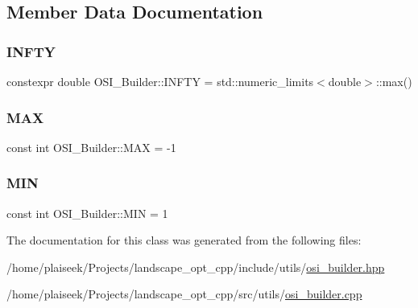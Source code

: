 \subsection{Member Data Documentation}
\mbox{\label{class_o_s_i___builder_ada1254828d2dd95d33cc28418270f88d}} 
\subsubsection{\texorpdfstring{I\+N\+F\+TY}{INFTY}}
{\footnotesize\ttfamily constexpr double O\+S\+I\+\_\+\+Builder\+::\+I\+N\+F\+TY = std\+::numeric\+\_\+limits$<$double$>$\+::max()\hspace{0.3cm}{\ttfamily [static]}}

\mbox{\label{class_o_s_i___builder_accf4032198acbf182e0d86af1c002c6e}} 
\subsubsection{\texorpdfstring{M\+AX}{MAX}}
{\footnotesize\ttfamily const int O\+S\+I\+\_\+\+Builder\+::\+M\+AX = -\/1\hspace{0.3cm}{\ttfamily [static]}}

\mbox{\label{class_o_s_i___builder_a3af4e2722a30807c440a3a243a3732f8}} 
\subsubsection{\texorpdfstring{M\+IN}{MIN}}
{\footnotesize\ttfamily const int O\+S\+I\+\_\+\+Builder\+::\+M\+IN = 1\hspace{0.3cm}{\ttfamily [static]}}



The documentation for this class was generated from the following files\+:\begin{DoxyCompactItemize}
\item 
/home/plaiseek/\+Projects/landscape\+\_\+opt\+\_\+cpp/include/utils/\hyperlink{osi__builder_8hpp}{osi\+\_\+builder.\+hpp}\item 
/home/plaiseek/\+Projects/landscape\+\_\+opt\+\_\+cpp/src/utils/\hyperlink{osi__builder_8cpp}{osi\+\_\+builder.\+cpp}\end{DoxyCompactItemize}
